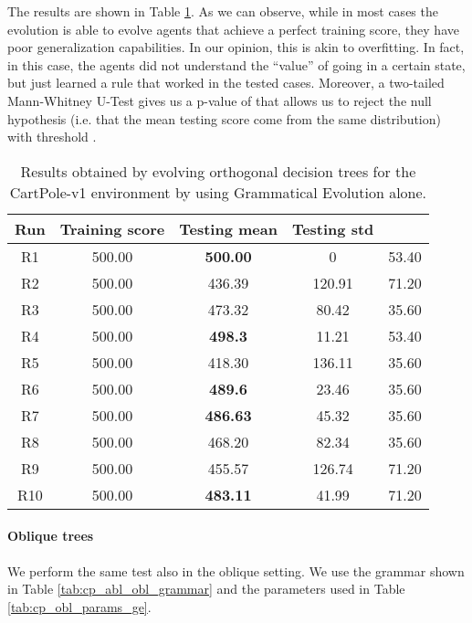 \documentclass[review,english]{elsarticle}
\begin{document}
The results are shown in Table \ref{tab:cp_abl_ort_results}.
As we can observe, while in most cases the evolution is able to evolve agents that achieve a perfect training score, they have poor generalization capabilities.
In our opinion, this is akin to overfitting.
In fact, in this case, the agents did not understand the ``value'' of going in a certain state, but just learned a rule that worked in the tested cases.
Moreover, a two-tailed Mann-Whitney U-Test gives us a p-value of  that allows us to reject the null hypothesis (i.e. that the mean testing score come from the same distribution) with threshold .

\begin{table}[ht]
    \centering
    \begin{tabular}{|c|c|c|c|c|} \hline
        \textbf{Run} & \textbf{Training score} & \textbf{Testing mean} & \textbf{Testing std} & \textbf{} \\ \hline
        R1 & 500.00 & \textbf{500.00} & 0 & 53.40 \\ R2 & 500.00 & 436.39 & 120.91 & 71.20 \\ R3 & 500.00 & 473.32 & 80.42 & 35.60 \\ R4 & 500.00 & \textbf{498.3} & 11.21 & 53.40 \\ R5 & 500.00 & 418.30 & 136.11 & 35.60 \\ R6 & 500.00 & \textbf{489.6} & 23.46 & 35.60 \\ R7 & 500.00 & \textbf{486.63} & 45.32 & 35.60 \\ R8 & 500.00 & 468.20 & 82.34 & 35.60 \\ R9 & 500.00 & 455.57 & 126.74 & 71.20 \\ R10 & 500.00 & \textbf{483.11} & 41.99 & 71.20 \\ \hline
    \end{tabular}
    \caption{Results obtained by evolving orthogonal decision trees for the CartPole-v1 environment by using Grammatical Evolution alone.}
    \label{tab:cp_abl_ort_results}
\end{table}

\paragraph{Oblique trees}
We perform the same test also in the oblique setting.
We use the grammar shown in Table \ref{tab:cp_abl_obl_grammar} and the parameters used in Table \ref{tab:cp_obl_params_ge}.
\end{document}
